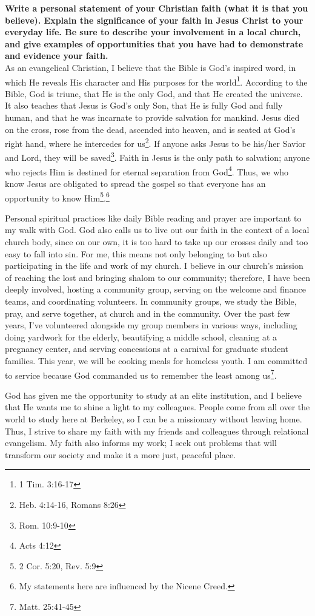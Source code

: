 \documentclass{article}
\begin{document}
	
\pagestyle{plain}

\textbf{Write a personal statement of your Christian faith (what it is that you believe). Explain the significance of your faith in Jesus Christ to your everyday life. Be sure to describe your involvement in a local church, and give examples of opportunities that you have had to demonstrate and evidence your faith.}\\

As an evangelical Christian, I believe that the Bible is God's inspired word, in which He reveals His character and His purposes for the world\footnote{1 Tim. 3:16-17}.
According to the Bible, God is triune, that He is the only God, and that He created the universe.
It also teaches that Jesus is God's only Son, that He is fully God and fully human, and that he was incarnate to provide salvation for mankind.  
Jesus died on the cross, rose from the dead, ascended into heaven, and is seated at God's right hand, where he intercedes for us\footnote{Heb. 4:14-16, Romans 8:26}. 
If anyone asks Jesus to be his/her Savior and Lord, they will be saved\footnote{Rom. 10:9-10}.
Faith in Jesus is the only path to salvation; anyone who rejects Him is destined for eternal separation from God\footnote{Acts 4:12}.  
Thus, we who know Jesus are obligated to spread the gospel so that everyone has an opportunity to know Him\footnote{2 Cor. 5:20, Rev. 5:9}.\footnote{My statements here are influenced by the Nicene Creed.}

Personal spiritual practices like daily Bible reading and prayer are important to my walk with God.
God also calls us to live out our faith in the context of a local church body, since on our own, it is too hard to take up our crosses daily and too easy to fall into sin.
For me, this means not only belonging to but also participating in the life and work of my church.  
I believe in our church's mission of reaching the lost and bringing shalom to our community; therefore, I have been deeply involved, hosting a community group, serving on the welcome and finance teams, and coordinating volunteers.
In community groups, we study the Bible, pray, and serve together, at church and in the community.  
Over the past few years, I've volunteered alongside my group members in various ways, including doing yardwork for the elderly, beautifying a middle school, cleaning at a pregnancy center, and serving concessions at a carnival for graduate student families.  This year, we will be cooking meals for homeless youth.
I am committed to service because God commanded us to remember the least among us\footnote{Matt. 25:41-45}.

God has given me the opportunity to study at an elite institution, and I believe that He wants me to shine a light to my colleagues.  
People come from all over the world to study here at Berkeley, so I can be a missionary without leaving home.  
Thus, I strive to share my faith with my friends and colleagues through relational evangelism.
My faith also informs my work; I seek out problems that will transform our society and make it a more just, peaceful place.
\end{document}
